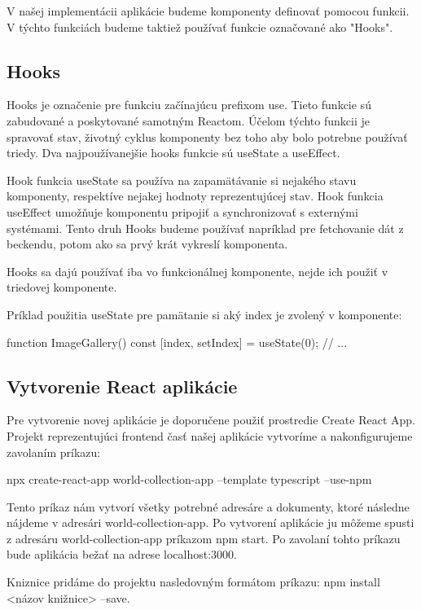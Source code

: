 V našej implementácii aplikácie budeme komponenty definovať pomocou funkcii. V týchto funkciách budeme taktiež používať funkcie označované ako "Hooks". 

\subsection*{Hooks}

Hooks je označenie pre funkciu začínajúcu prefixom use. Tieto funkcie sú zabudované a poskytované samotným Reactom. 
Účelom týchto funkcii je spravovať stav, životný cyklus komponenty bez toho aby bolo potrebne 
používať triedy. Dva najpoužívanejšie hooks funkcie sú useState a useEffect. 

Hook funkcia useState sa používa na zapamätávanie si nejakého stavu komponenty, respektíve nejakej hodnoty reprezentujúcej stav. 
Hook funkcia useEffect umožňuje komponentu pripojiť a synchronizovať s externými systémami. Tento druh Hooks budeme používať napríklad pre fetchovanie dát z beckendu, potom ako 
sa prvý krát vykreslí komponenta. 

Hooks sa dajú používať iba vo funkcionálnej komponente, nejde ich použiť v triedovej komponente.

Príklad použitia useState pre pamätanie si aký index je zvolený v komponente: 
\begin{code}
function ImageGallery() {
            const [index, setIndex] = useState(0);
             // ...
      }
\end{code}

\subsection{Vytvorenie React aplikácie }

Pre vytvorenie novej aplikácie je doporučene použiť prostredie Create React App. Projekt reprezentujúci frontend časť našej aplikácie vytvoríme a nakonfigurujeme zavolaním príkazu: 
\begin{code}
      npx create-react-app world-collection-app 
      --template typescript --use-npm
\end{code}
Tento príkaz nám vytvorí všetky potrebné adresáre a dokumenty, ktoré následne nájdeme v adresári world-collection-app. 
Po vytvorení aplikácie ju môžeme spusti z adresáru world-collection-app príkazom npm start. Po zavolaní tohto príkazu bude aplikácia bežať na adrese localhost:3000. 

Kniznice pridáme do projektu nasledovným formátom príkazu: npm install <názov knižnice> --save. 

